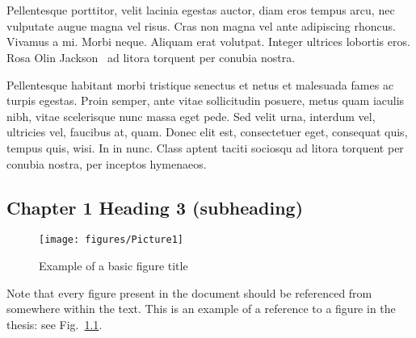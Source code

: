 \chapter{
    }


Pellentesque porttitor, velit lacinia egestas auctor, diam eros tempus arcu, nec vulputate augue magna vel risus. Cras non magna vel ante adipiscing rhoncus. Vivamus a mi. Morbi neque. Aliquam erat volutpat. Integer ultrices lobortis eros. Rosa Olin Jackson~\cite{waveshaping} ad litora torquent per conubia nostra.\par

Pellentesque habitant morbi tristique senectus et netus et malesuada fames ac turpis egestas. Proin semper, ante vitae sollicitudin posuere, metus quam iaculis nibh, vitae scelerisque nunc massa eget pede. Sed velit urna, interdum vel, ultricies vel, faucibus at, quam. Donec elit est, consectetuer eget, consequat quis, tempus quis, wisi. In in nunc. Class aptent taciti sociosqu ad litora torquent per conubia nostra, per inceptos hymenaeos.\par




\section{Chapter 1 Heading 3 (subheading)}

\begin{figure}
\texttt{[image: figures/Picture1]}

\label{fig:img1}
\caption{Example of a basic figure title}
\end{figure}

Note that every figure present in the document should be referenced from somewhere within the text.  This is an example of a reference to a figure in the thesis: see Fig.~\ref{fig:img1}. 


